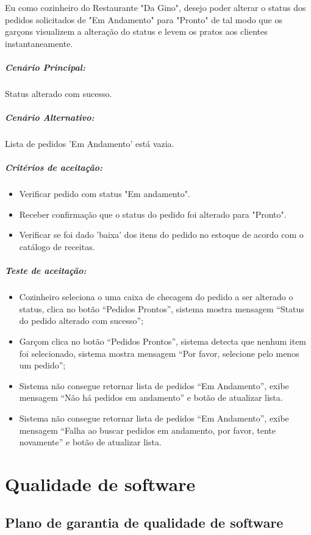 Eu como cozinheiro do Restaurante "Da Gino", desejo poder alterar o status dos pedidos solicitados de "Em Andamento" para "Pronto" de tal modo que os garçons visualizem a alteração do status e levem os pratos aos clientes instantaneamente.

\subparagraph{Cenário Principal:}

Status alterado com sucesso.

\subparagraph{Cenário Alternativo:}

Lista de pedidos 'Em Andamento' está vazia.

\subparagraph{Critérios de aceitação:}

\begin{itemize}
\item Verificar pedido com status "Em andamento".
\item Receber confirmação que o status do pedido foi alterado para "Pronto".
\item Verificar se foi dado 'baixa' dos itens do pedido no estoque de acordo com o catálogo de receitas.

\end{itemize}

\subparagraph{Teste de aceitação:}

\begin{itemize}
  \item Cozinheiro seleciona o uma caixa de checagem do pedido a ser alterado o status, clica no botão “Pedidos Prontos”, sistema mostra mensagem “Status do pedido alterado com sucesso”;
\item Garçom clica no botão “Pedidos Prontos”, sistema detecta que nenhum item foi selecionado, sistema mostra mensagem “Por favor, selecione pelo menos um pedido”;
\item Sistema não consegue retornar lista de pedidos “Em Andamento”, exibe mensagem “Não há pedidos em andamento” e botão de atualizar lista.
\item Sistema não consegue retornar lista de pedidos “Em Andamento”, exibe mensagem “Falha ao buscar pedidos em andamento, por favor, tente novamente” e botão de atualizar lista.

\end{itemize}

\section{Qualidade de software}
\label{sec:qualisoftware}

\subsection{Plano de garantia de qualidade de software}

